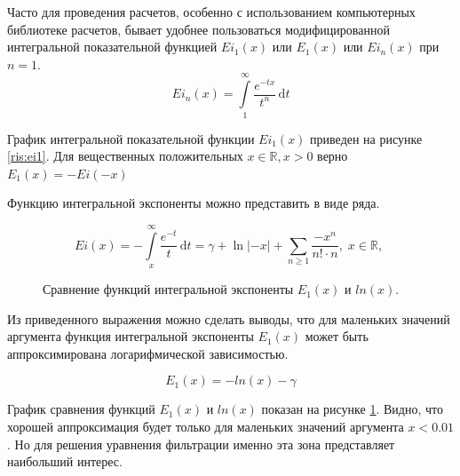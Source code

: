 Часто для проведения расчетов, особенно с использованием компьютерных библиотеке расчетов, бывает удобнее пользоваться модифицированной интегральной показательной функцией $Ei_1(x)$ или $E_1(x)$ или $Ei_n(x)$ при $n=1$.
 $$Ei_n(x) = \int\limits_{1}^{\infty}\frac{e^{-tx}}{t^n}\,\mathrm dt $$

График интегральной показательной функции $Ei_1(x)$ приведен на рисунке \ref{ris:ei1}.
Для вещественных положительных $x\in\mathbb R, x>0$ верно $E_1(x) = - Ei( -x)$

Функцию интегральной экспоненты можно представить в виде ряда. 

$$Ei(x)=-\int\limits_{x}^{\infty}\frac{e^{-t}}{t}\,\mathrm dt=\gamma+\operatorname{ln}|-x|+\sum\limits_{n\ge1}\frac{{-x}^n}{n!\cdot n}, \;  x\in\mathbb R,\;$$

\begin{figure}
	\begin{center}
		\caption{Сравнение функций интегральной экспоненты $E_1(x)$ и $ln(x)$.}
		\label{ris:ei2}
	\end{center}
\end{figure}

Из приведенного выражения можно сделать выводы, что для маленьких значений аргумента  функция интегральной экспоненты $E_1(x)$ может быть аппроксимирована логарифмической зависимостью. 

$$E_1(x) = -ln(x) - \gamma $$

График сравнения функций $E_1(x)$ и $ln(x)$ показан на рисунке \ref{ris:ei2}. Видно, что хорошей аппроксимация будет только для маленьких значений аргумента $x < 0.01$. Но для решения уравнения фильтрации именно эта зона представляет наибольший интерес.

